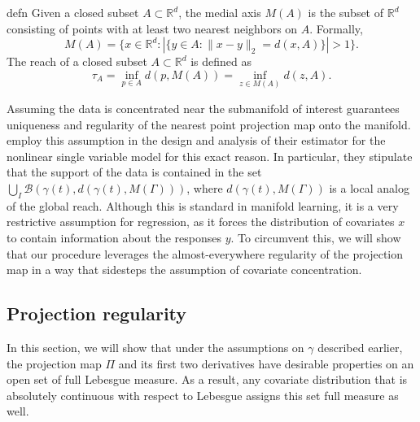 \documentclass[11pt]{article}
\begin{document}
\begin{restatable}{defn}{}
    Given a closed subset $A \subset \mathbb{R}^d$, the medial axis $M(A)$ is the subset of $\mathbb{R}^d$ consisting of points with at least two nearest neighbors on $A$. Formally,
    \begin{equation}
    M(A) = \{x \in \mathbb{R}^d : |\{y \in A : \|x-y\|_2 = d(x,A)\}| > 1\}. \label{eq: medial axis definition}
    \end{equation}
    The reach of a closed subset $A \subset \mathbb{R}^d$ is defined as 
    \begin{equation}
        \tau_A = \inf_{p\in A} d(p,M(A)) = \inf_{z\in M(A)}d(z,A). \label{eq: reach definition}
    \end{equation}
\end{restatable}

Assuming the data is concentrated near the submanifold of interest guarantees uniqueness and regularity of the nearest point projection map onto the manifold. \citet{wu2024conditional} employ this assumption in the design and analysis of their estimator for the nonlinear single variable model for this exact reason. In particular, they stipulate that the support of the data is contained in the set $\bigcup_{I}\mathcal{B}(\gamma(t), d(\gamma(t), M(\Gamma)))$, where $d(\gamma(t), M(\Gamma))$ is a local analog of the global reach. Although this is standard in manifold learning, it is a very restrictive assumption for regression, as it forces the distribution of covariates $x$ to contain information about the responses $y$. To circumvent this, we will show that our procedure leverages the almost-everywhere regularity of the projection map in a way that sidesteps the assumption of covariate concentration.

\subsection{Projection regularity}
In this section, we will show that under the assumptions on $\gamma$ described earlier, the projection map $\Pi$ and its first two derivatives have desirable properties on an open set of full Lebesgue measure. As a result, any covariate distribution that is absolutely continuous with respect to Lebesgue assigns this set full measure as well.  
\end{document}

